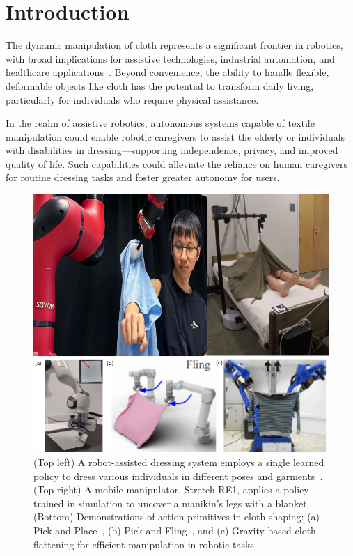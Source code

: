 \section{Introduction}

The dynamic manipulation of cloth represents a significant frontier in robotics, with broad implications for assistive technologies, industrial automation, and healthcare applications~\cite{doumanoglou2014autonomous, maitin2010cloth, erickson2018deep, erickson2018tracking, erickson2020assistive, yu2017haptic}. Beyond convenience, the ability to handle flexible, deformable objects like cloth has the potential to transform daily living, particularly for individuals who require physical assistance.

In the realm of assistive robotics, autonomous systems capable of textile manipulation could enable robotic caregivers to assist the elderly or individuals with disabilities in dressing—supporting independence, privacy, and improved quality of life. Such capabilities could alleviate the reliance on human caregivers for routine dressing tasks and foster greater autonomy for users.

\begin{figure}
\centering
\includegraphics[width=\columnwidth]{CLOTH REPORT PICS/high_level.png}
\caption[Robotic Cloth Manipulation]{(Top left) A robot-assisted dressing system employs a single learned policy to dress various individuals in different poses and garments~\cite{Wang2023One}. (Top right) A mobile manipulator, Stretch RE1, applies a policy trained in simulation to uncover a manikin’s legs with a blanket~\cite{puthuveetil2022bodies}. (Bottom) Demonstrations of action primitives in cloth shaping: (a) Pick-and-Place~\cite{lee2021learning}, (b) Pick-and-Fling~\cite{ha2022flingbot}, and (c) Gravity-based cloth flattening for efficient manipulation in robotic tasks~\cite{doumanoglou2014autonomous}.}
\label{fig:robotic_cloth_manipulation}
\end{figure}


